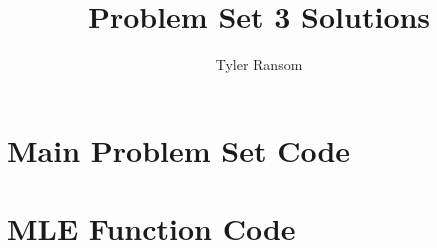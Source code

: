 \documentclass[12pt,english]{article}
\title{Problem Set 3 Solutions}
\author{Tyler Ransom}
\begin{document}
\maketitle

\section{Main Problem Set Code}


\pagebreak{}
\section{MLE Function Code}

\end{document}
